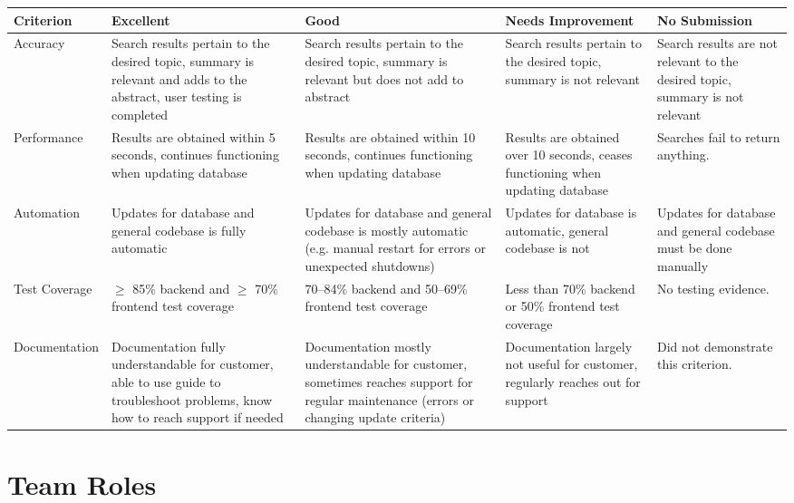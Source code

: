\documentclass{article}
\begin{document}
\begin{tabularx}{\textwidth}{|X|X|X|X|X|}
    \hline
    \textbf{Criterion} & \textbf{Excellent} & \textbf{Good} & \textbf{Needs Improvement} & \textbf{No Submission}\\
    \hline
    Accuracy & Search results pertain to the desired topic, summary is relevant and adds to the abstract, user testing is completed & Search results pertain to the desired topic, summary is relevant but does not add to abstract & Search results pertain to the desired topic, summary is not relevant & Search results are not relevant to the desired topic, summary is not relevant\\
    \hline     
    Performance & Results are obtained within 5 seconds, continues functioning when updating database & Results are obtained within 10 seconds, continues functioning when updating database & Results are obtained over 10 seconds, ceases functioning when updating database & Searches fail to return anything. \\
    \hline
    Automation & Updates for database and general codebase is fully automatic & Updates for database and general codebase is mostly automatic (e.g. manual restart for errors or unexpected shutdowns) & Updates for database is automatic, general codebase is not & Updates for database and general codebase must be done manually \\
    \hline     
     Test Coverage & $\geq$ 85\% backend and $\geq$ 70\% frontend test coverage & 70--84\% backend and 50--69\% frontend test coverage & Less than 70\% backend or 50\% frontend test coverage & No testing evidence. \\
    \hline
    Documentation & Documentation fully understandable for customer, able to use guide to troubleshoot problems, know how to reach support if needed &  Documentation mostly understandable for customer, sometimes reaches support for regular maintenance (errors or changing update criteria) &  Documentation largely not useful for customer, regularly reaches out for support & Did not demonstrate this criterion. \\
    \hline
    
\end{tabularx}



\section*{Team Roles}
\end{document}
